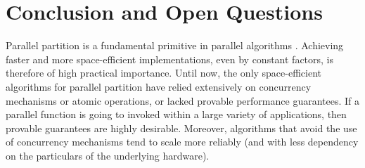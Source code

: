 \documentclass[11pt]{article}
\theoremstyle{remark}
\theoremstyle{remark}
\begin{document}




\section{Conclusion and Open Questions}

Parallel partition is a fundamental primitive in parallel algorithms
\cite{Blelloch96,AcarBl16}. Achieving faster and more space-efficient
implementations, even by constant factors, is therefore of high
practical importance. Until now, the only space-efficient algorithms
for parallel partition have relied extensively on concurrency
mechanisms or atomic operations, or lacked provable performance
guarantees. If a parallel function is going to invoked within a large
variety of applications, then provable guarantees are highly
desirable. Moreover, algorithms that avoid the use of concurrency
mechanisms tend to scale more reliably (and with less dependency on
the particulars of the underlying hardware).
\end{document}

